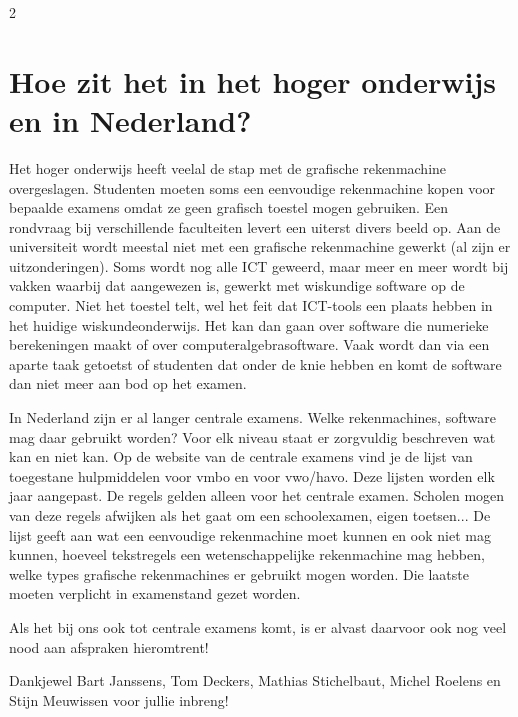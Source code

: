 \begin{multicols}{2}
	\section{Hoe zit het in het hoger onderwijs en in Nederland?}
	Het hoger onderwijs heeft veelal de stap met de grafische rekenmachine overgeslagen. Studenten moeten soms een eenvoudige rekenmachine kopen voor bepaalde examens omdat ze geen grafisch toestel mogen gebruiken. Een rondvraag bij verschillende faculteiten levert een uiterst divers beeld op. Aan de universiteit wordt meestal niet met een grafische rekenmachine gewerkt (al zijn er uitzonderingen). Soms wordt nog alle ICT geweerd, maar meer en meer wordt bij vakken waarbij dat aangewezen is, gewerkt met wiskundige software op de computer. Niet het toestel telt, wel het feit dat ICT-tools een plaats hebben in het huidige wiskundeonderwijs. Het kan dan gaan over software die numerieke berekeningen maakt of over computeralgebrasoftware. Vaak wordt dan via een aparte taak getoetst of studenten dat onder de knie hebben en komt de software dan niet meer aan bod op het examen. 
	 
In Nederland zijn er al langer centrale examens. Welke rekenmachines, software mag daar gebruikt worden? Voor elk niveau staat er zorgvuldig beschreven wat kan en niet kan. Op de website van de centrale examens vind je de lijst van toegestane hulpmiddelen voor vmbo en voor vwo/havo. Deze lijsten worden elk jaar aangepast. De regels gelden alleen voor het centrale examen. Scholen mogen van deze regels afwijken als het gaat om een schoolexamen, eigen toetsen... De lijst geeft aan wat een eenvoudige rekenmachine moet kunnen en ook niet mag kunnen, hoeveel tekstregels een wetenschappelijke rekenmachine mag hebben, welke types grafische rekenmachines er gebruikt mogen worden. Die laatste moeten verplicht in examenstand gezet worden.

Als het bij ons ook tot centrale examens komt, is er alvast daarvoor ook nog veel nood aan afspraken hieromtrent!

Dankjewel Bart Janssens, Tom Deckers,  Mathias Stichelbaut, Michel Roelens en Stijn Meuwissen voor jullie inbreng!

\end{multicols}	


	
